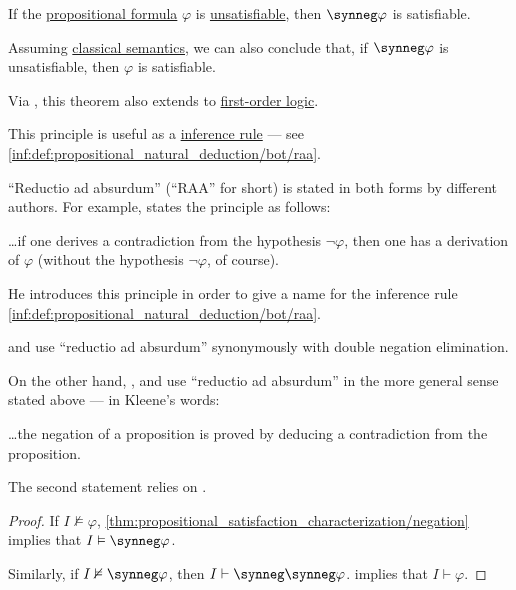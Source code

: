\begin{theorem}\label{thm:propositional_semantic_raa}
  If the \hyperref[def:propositional_formula]{propositional formula} \( \varphi \) is \hyperref[def:propositional_semantics/satisfaction]{unsatisfiable}, then \( \synneg \varphi \) is satisfiable.

  Assuming \hyperref[def:truth_value_algebra/classical]{classical semantics}, we can also conclude that, if \( \synneg \varphi \) is unsatisfiable, then \( \varphi \) is satisfiable.
\end{theorem}
\begin{comments}
  \item Via , this theorem also extends to \hyperref[def:first_order_logic]{first-order logic}.

  \item This principle is useful as a \hyperref[def:inference_rule]{inference rule} --- see \ref{inf:def:propositional_natural_deduction/bot/raa}.

  \item \enquote{Reductio ad absurdum} (\enquote{RAA} for short) is stated in both forms by different authors. For example, \textcite[31]{VanDalen2004LogicAndStructure} states the principle as follows:
  \begin{displayquote}
    \ldots if one derives a contradiction from the hypothesis \( \neg \varphi \), then one has a derivation of \( \varphi \) (without the hypothesis \( \neg \varphi \), of course).
  \end{displayquote}

  He introduces this principle in order to give a name for the inference rule \ref{inf:def:propositional_natural_deduction/bot/raa}.

  \textcite[thm. 2.5.1.1(ii)]{Mimram2020ProgramEqualsProof} and \textcite[100]{КолмогоровДрагалин2006ЛогикаВведение} use \enquote{reductio ad absurdum} synonymously with double negation elimination.

  On the other hand, \textcite[15]{Kleene1971Metamathematics}, \textcite[187]{Gentzen1935LogischeSchließen} and \textcite[90]{CitkinMuravitsky2022ConsequenceRelations} use \enquote{reductio ad absurdum} in the more general sense stated above --- in Kleene's words:
  \begin{displayquote}
    \ldots the negation of a proposition is proved by deducing a contradiction from the proposition.
  \end{displayquote}

  \item The second statement relies on .
\end{comments}
\begin{proof}
  If \( I \nvDash \varphi \), \cref{thm:propositional_satisfaction_characterization/negation} implies that \( I \vDash \synneg \varphi \).

  Similarly, if \( I \nvDash \synneg \varphi \), then \( I \vdash \synneg \synneg \varphi \).  implies that \( I \vdash \varphi \).
\end{proof}

